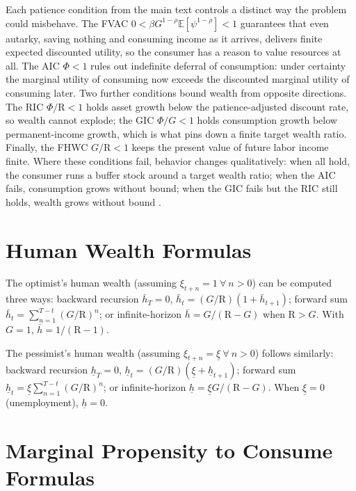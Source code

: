 \documentclass[preprint,authoryear]{elsarticle}
\newcommand{\CRRA}{\rho}
\newcommand{\DiscFac}{\beta}
\newcommand{\Ex}{\mathbf{\mathbb{E}}}
\newcommand{\Rfree}{\text{R}}
\newcommand{\tranShk}{\xi}
\newcommand{\PermGroFac}{G}
\newcommand{\permShk}{\psi}
\newcommand{\AbsPatFac}{\Phi}
\newcommand{\hNrm}{h}
\newcommand{\hNrmOpt}{\bar{\hNrm}}
\newcommand{\hNrmPes}{\underline{\hNrm}}
\newcommand{\tranShkMin}{\underline{\tranShk}}
\begin{document}
Each patience condition from the main text controls a distinct way the problem could misbehave. The FVAC $0<\DiscFac\PermGroFac^{1 -\CRRA}\Ex[\permShk^{1 -\CRRA}]<1$ guarantees that even autarky, saving nothing and consuming income as it arrives, delivers finite expected discounted utility, so the consumer has a reason to value resources at all. The AIC $\AbsPatFac<1$ rules out indefinite deferral of consumption: under certainty the marginal utility of consuming now exceeds the discounted marginal utility of consuming later. Two further conditions bound wealth from opposite directions. The RIC $\AbsPatFac/\Rfree<1$ holds asset growth below the patience-adjusted discount rate, so wealth cannot explode; the GIC $\AbsPatFac/\PermGroFac<1$ holds consumption growth below permanent-income growth, which is what pins down a finite target wealth ratio. Finally, the FHWC $\PermGroFac/\Rfree<1$ keeps the present value of future labor income finite. Where these conditions fail, behavior changes qualitatively: when all hold, the consumer runs a buffer stock around a target wealth ratio; when the AIC fails, consumption grows without bound; when the GIC fails but the RIC still holds, wealth grows without bound \citep{Carroll1997, SolvingMicroDSOPs, CarrollShanker2024}.

\section{Human Wealth Formulas}

The optimist's human wealth (assuming $\tranShk_{t+n}=1~\forall~n>0$) can be computed three ways: backward recursion $\hNrmOpt_{T} = 0$, $\hNrmOpt_{t} = (\PermGroFac/\Rfree)(1 + \hNrmOpt_{t+1})$; forward sum $\hNrmOpt_{t} = \sum_{n=1}^{T -t}(\PermGroFac/\Rfree)^{n}$; or infinite-horizon $\hNrmOpt = \PermGroFac/(\Rfree -\PermGroFac)$ when $\Rfree>\PermGroFac$. With $\PermGroFac=1$, $\hNrmOpt = 1/(\Rfree -1)$.

The pessimist's human wealth (assuming $\tranShk_{t+n}=\tranShkMin~\forall~n>0$) follows similarly: backward recursion $\hNrmPes_{T}=0$, $\hNrmPes_{t}=(\PermGroFac/\Rfree)(\tranShkMin + \hNrmPes_{t+1})$; forward sum $\hNrmPes_{t}=\tranShkMin\sum_{n=1}^{T -t}(\PermGroFac/\Rfree)^{n}$; or infinite-horizon $\hNrmPes=\tranShkMin\PermGroFac/(\Rfree -\PermGroFac)$. When $\tranShkMin=0$ (unemployment), $\hNrmPes=0$.

\section{Marginal Propensity to Consume Formulas}
\end{document}
